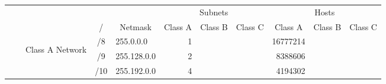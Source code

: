 \documentclass[11pt,a4paper]{article}
\begin{document}
\begin{table}[]
\begin{tabular}{ccccl|r|r|r|r|r|r|}
\cline{6-11}
                                                       &                                                        &                                                        &                          &                              & \multicolumn{3}{c|}{Subnets}                                                               & \multicolumn{3}{c|}{Hosts}                                                                 \\ \cline{4-11} 
                                                       &                                                        & \multicolumn{1}{c|}{}                                  & \multicolumn{1}{c|}{/}   & \multicolumn{1}{c|}{Netmask} & \multicolumn{1}{c|}{Class A} & \multicolumn{1}{c|}{Class B} & \multicolumn{1}{c|}{Class C} & \multicolumn{1}{c|}{Class A} & \multicolumn{1}{c|}{Class B} & \multicolumn{1}{c|}{Class C} \\ \cline{3-11} 
                                                       & \multicolumn{1}{c|}{}                                  & \multicolumn{1}{c|}{\multirow{23}{*}{\begin{sideways}Class A Network\end{sideways}}} & \multicolumn{1}{c|}{/8}  & 255.0.0.0                    & 1                            &                              &                              & 16777214                     &                              &                              \\ \cline{4-11} 
                                                       & \multicolumn{1}{c|}{}                                  & \multicolumn{1}{c|}{}                                  & \multicolumn{1}{c|}{/9}  & 255.128.0.0                  & 2                            &                              &                              & 8388606                      &                              &                              \\ \cline{4-11} 
                                                       & \multicolumn{1}{c|}{}                                  & \multicolumn{1}{c|}{}                                  & \multicolumn{1}{c|}{/10} & 255.192.0.0                  & 4                            &                              &                              & 4194302                      &                              &                              \\ \cline{4-11} 

\end{tabular}
\end{table}
\end{document}
